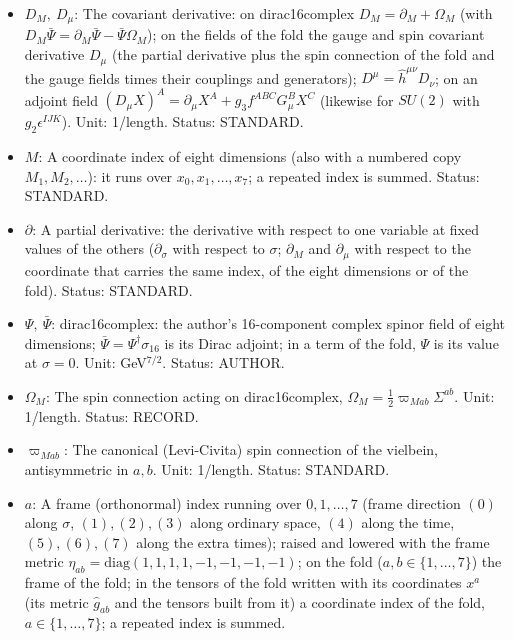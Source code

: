 \documentclass[
  10pt,
]{article}
\providecommand{\tightlist}{%
  \setlength{\itemsep}{0pt}\setlength{\parskip}{0pt}}
\begin{document}
\begin{itemize}
\tightlist
\item
  \(D_M,\ D_\mu\): The covariant derivative: on dirac16complex
  \(D_M = \partial_M + \Omega_M\) (with
  \(D_M\bar\Psi = \partial_M\bar\Psi - \bar\Psi\Omega_M\)); on the
  fields of the fold the gauge and spin covariant derivative \(D_\mu\)
  (the partial derivative plus the spin connection of the fold and the
  gauge fields times their couplings and generators);
  \(D^\mu = \hat h^{\mu\nu}D_\nu\); on an adjoint field
  \((D_\mu X)^A = \partial_\mu X^A + g_3f^{ABC}G^B_\mu X^C\) (likewise
  for \(SU(2)\) with \(g_2\epsilon^{IJK}\)). Unit: 1/length. Status:
  STANDARD.
\item
  \(M\): A coordinate index of eight dimensions (also with a numbered
  copy \(M_1, M_2, \dots\)): it runs over \(x_0, x_1, \dots, x_7\); a
  repeated index is summed. Status: STANDARD.
\item
  \(\partial\): A partial derivative: the derivative with respect to one
  variable at fixed values of the others (\(\partial_\sigma\) with
  respect to \(\sigma\); \(\partial_M\) and \(\partial_\mu\) with
  respect to the coordinate that carries the same index, of the eight
  dimensions or of the fold). Status: STANDARD.
\item
  \(\Psi,\ \bar\Psi\): dirac16complex: the author's 16-component complex
  spinor field of eight dimensions;
  \(\bar\Psi = \Psi^\dagger\sigma_{16}\) is its Dirac adjoint; in a term
  of the fold, \(\Psi\) is its value at \(\sigma = 0\). Unit:
  GeV\(^{7/2}\). Status: AUTHOR.
\item
  \(\Omega_M\): The spin connection acting on dirac16complex,
  \(\Omega_M = \frac12\varpi_{Mab}\Sigma^{ab}\). Unit: 1/length. Status:
  RECORD.
\item
  \(\varpi_{Mab}\): The canonical (Levi-Civita) spin connection of the
  vielbein, antisymmetric in \(a, b\). Unit: 1/length. Status: STANDARD.
\item
  \(a\): A frame (orthonormal) index running over \(0, 1, \dots, 7\)
  (frame direction \((0)\) along \(\sigma\), \((1), (2), (3)\) along
  ordinary space, \((4)\) along the time, \((5), (6), (7)\) along the
  extra times); raised and lowered with the frame metric
  \(\eta_{ab} = \mathrm{diag}(1, 1, 1, 1, -1, -1, -1, -1)\); on the fold
  (\(a, b \in \{1, \dots, 7\}\)) the frame of the fold; in the tensors
  of the fold written with its coordinates \(x^a\) (its metric
  \(\hat g_{ab}\) and the tensors built from it) a coordinate index of
  the fold, \(a \in \{1, \dots, 7\}\); a repeated index is summed.

\end{itemize}
\end{document}

